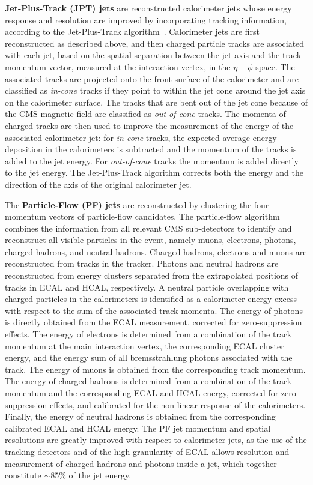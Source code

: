 {\bf Jet-Plus-Track (JPT) jets} are reconstructed calorimeter jets whose energy response and resolution are improved by incorporating tracking information, according to the Jet-Plus-Track algorithm~\cite{JME-09-002}. Calorimeter jets are first reconstructed as described above, and then charged particle tracks are associated with each jet, based on the spatial separation between the jet axis and the track momentum vector, measured at the interaction vertex, in the $\eta-\phi$ space. The associated tracks are projected onto the front surface of the calorimeter and are classified as \textit{in-cone} tracks if they point to within the jet cone around the jet axis on the calorimeter surface. The tracks that are bent out of the jet cone because of the CMS magnetic field are classified as \textit{out-of-cone} tracks. The momenta of charged tracks are then used to improve the measurement of the energy of the associated calorimeter jet: for \textit{in-cone} tracks, the expected average energy deposition in the calorimeters is subtracted and the momentum of the tracks is added to the jet energy. For \textit{out-of-cone} tracks the momentum is added directly to the jet energy. The Jet-Plus-Track algorithm corrects both the energy and the direction of the axis of the original calorimeter jet.

The {\bf Particle-Flow (PF) jets} are reconstructed by clustering the four-momentum vectors of particle-flow candidates. The particle-flow algorithm~\cite{PFT-09-001,PFT-10-002} combines the information from all relevant CMS sub-detectors to identify and reconstruct all visible particles in the event, namely muons, electrons, photons, charged hadrons, and neutral hadrons. Charged hadrons, electrons and muons are reconstructed from tracks in the tracker. Photons and neutral hadrons are reconstructed from energy clusters separated from the extrapolated positions of tracks in ECAL and HCAL, respectively. A neutral particle overlapping with charged particles in the calorimeters is identified as a calorimeter energy excess with respect to the sum of the associated track momenta. The energy of photons is directly obtained from the ECAL measurement, corrected for zero-suppression effects. The energy of electrons is determined from a combination of the track momentum at the main interaction vertex, the corresponding ECAL cluster energy, and the energy sum of all bremsstrahlung photons associated with the track. The energy of muons is obtained from the corresponding track momentum. The energy of charged hadrons is determined from a combination of the track momentum and the corresponding ECAL and HCAL energy, corrected for zero-suppression effects, and calibrated for the non-linear response of the calorimeters. Finally, the energy of neutral hadrons is obtained from the corresponding calibrated ECAL and HCAL energy. The PF jet momentum and spatial resolutions are greatly improved with respect to calorimeter jets, as the use of the tracking detectors and of the high granularity of ECAL allows resolution and measurement of charged hadrons and photons inside a jet, which together constitute $\sim$85\% of the jet energy. 

